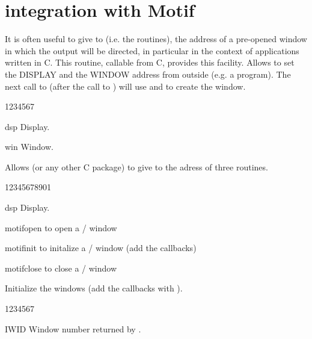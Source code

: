 \section{\HIGZ{} integration with Motif}

It is often useful to give to \HIGZ{} (i.e. the  routines), the 
address of
a pre-opened window in which the \HIGZ{} output will be directed,
in particular in the context of \MOTIF{} applications written in C. This
routine, callable from C, provides this facility.
\Action
Allows to set the DISPLAY and the WINDOW address
from outside \HIGZ{} (e.g. a \MOTIF{} program).
The next call to  (after the call to )
will use  and  to create the window.
\Pdesc
\begin{DLtt}{1234567}
\item[dsp] Display.
\item[win] Window.
\end{DLtt}


Allows \KUIP{} (or any other C package) to give to \HIGZ{} the adress of three
routines.
\begin{DLtt}{12345678901}
\item[dsp] Display.
\item[motifopen] to open a \KUIP{}/\MOTIF{} window
\item[motifinit] to initalize a \KUIP{}/\MOTIF{} window (add the callbacks)
\item[motifclose] to close a \KUIP{}/\MOTIF{} window
\end{DLtt}

Initialize the \MOTIF{} windows (add the callbacks with ).
\begin{DLtt}{1234567}
\item[IWID] Window number returned by .
\end{DLtt}
